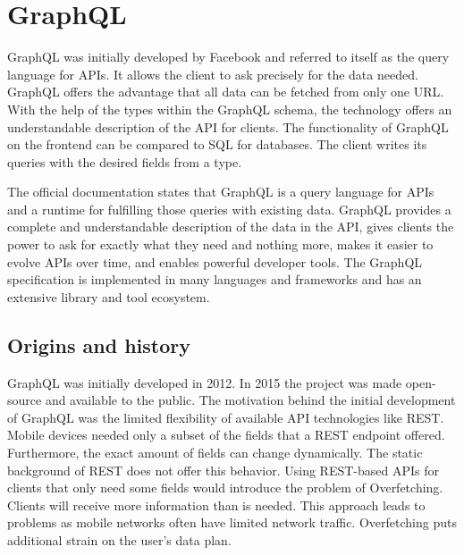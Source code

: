 \section{GraphQL}\label{section:background:graphql}

GraphQL was initially developed by Facebook and referred to itself as the query language for APIs. It allows the client to ask precisely for the data needed. GraphQL offers the advantage that all data can be fetched from only one URL. With the help of the types within the GraphQL schema, the technology offers an understandable description of the API for clients. \cite{misc:-:background:graphql:graphql-org} The functionality of GraphQL on the frontend can be compared to SQL for databases. The client writes its queries with the desired fields from a type.

\bigskip

\noindent The official documentation states that GraphQL is a query language for APIs and a runtime for fulfilling those queries with existing data. GraphQL provides a complete and understandable description of the data in the API, gives clients the power to ask for exactly what they need and nothing more, makes it easier to evolve APIs over time, and enables powerful developer tools. The GraphQL specification is implemented in many languages and frameworks and has an extensive library and tool ecosystem.

\subsection{Origins and history}\label{subsection:background:graphql:origins-and-history}

GraphQL was initially developed in 2012. In 2015 the project was made open-source and available to the public. The motivation behind the initial development of GraphQL was the limited flexibility of available API technologies like REST. Mobile devices needed only a subset of the fields that a REST endpoint offered. Furthermore, the exact amount of fields can change dynamically. The static background of REST does not offer this behavior. Using REST-based APIs for clients that only need some fields would introduce the problem of Overfetching. Clients will receive more information than is needed. This approach leads to problems as mobile networks often have limited network traffic. Overfetching puts additional strain on the user's data plan. \cite{misc:2015:bryon:background:graphql:graphql-query-language}

